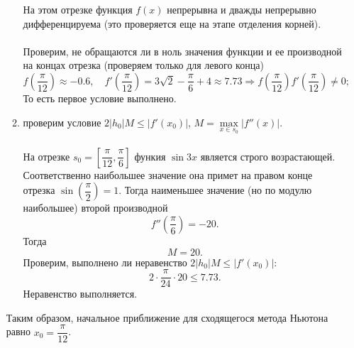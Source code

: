 \documentclass[a4paper, 12pt]{article}
\renewcommand{\leq}{\leqslant}
\begin{document}
\begin{enumerate}
\begin{enumerate}
			На этом отрезке функция $f(x)$ непрерывна и дважды непрерывно дифференцируема (это проверяется еще на этапе отделения корней).\\\\
			Проверим, не обращаются ли в ноль значения функции и ее производной на концах отрезка (проверяем только для левого конца)
			$$f\left(\dfrac{\pi}{12}\right) \approx -0.6,\quad f'\left(\dfrac{\pi}{12}\right) = 3\sqrt 2 - \dfrac{\pi}{6} + 4\approx 7.73\Rightarrow f\left(\dfrac{\pi}{12}\right)f'\left(\dfrac{\pi}{12}\right)\ne 0;$$
			То есть первое условие выполнено.
			\item проверим условие $2|h_0|M \leq |f'(x_0)|$, $M = \underset{x\in s_0}{\max}|f''(x)|$.\\\\
			На отрезке $s_0 = \left[\dfrac{\pi}{12}, \dfrac\pi6\right]$ функия $\sin3x$ является строго возрастающей. Соответственно наибольшее значение она примет на правом конце отрезка $\sin \left(\dfrac\pi2\right) =1$. Тогда наименьшее значение (но по модулю наибольшее) второй производной $$f''\left(\dfrac\pi6\right)=-20.$$
			Тогда $$M = 20.$$
			Проверим, выполнено ли неравенство $2|h_0|M \leq |f'(x_0)|$:
			$$2\cdot \dfrac{\pi}{24} \cdot 20 \leq 7.73.$$
			Неравенство выполняется.
		\end{enumerate}
		Таким образом, начальное приближение для сходящегося метода Ньютона равно $x_0 = \dfrac{\pi}{12}$.
		

\end{enumerate}
\end{document}
